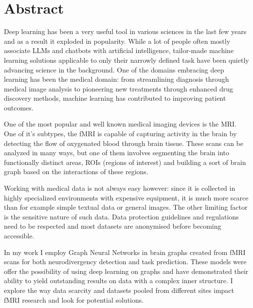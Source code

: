 \vfill
\selectenglish


\chapter*{Abstract}

Deep learning has been a very useful tool in various sciences in the last few years and as a result it exploded in popularity. While a lot of people often mostly associate LLMs and chatbots with artificial intelligence, tailor-made machine learning solutions applicable to only their narrowly defined task have been quietly advancing science in the background. One of the domains embracing deep learning has been the medical domain: from streamlining diagnosis through medical image analysis to pioneering new treatments through enhanced drug discovery methods, machine learning has contributed to improving patient outcomes.

One of the most popular and well known medical imaging devices is the MRI. One of it's subtypes, the fMRI is capable of capturing activity in the brain by detecting the flow of oxygenated blood through brain tissue. These scans can be analyzed in many ways, but one of them involves segmenting the brain into functionally distinct areas, ROIs (regions of interest) and building a sort of brain graph based on the interactions of these regions. 

Working with medical data is not always easy however: since it is collected in highly specialized environments with expensive equipment, it is much more scarce than for example simple textual data or general images. The other limiting factor is the sensitive nature of such data. Data protection guidelines and regulations need to be respected and most datasets are anonymised before becoming accessible.

In my work I employ Graph Neural Networks in brain graphs created from fMRI scans for both neurodivergency detection and task prediction. These models were offer the possibility of using deep learning on graphs and have demonstrated their ability to yield outstanding results on data with a complex inner structure. I explore the way data scarcity and datasets pooled from different sites impact fMRI research and look for potential solutions.

\vfill
\selectthesislanguage

\setcounter{romanPage}{\value{page}}
